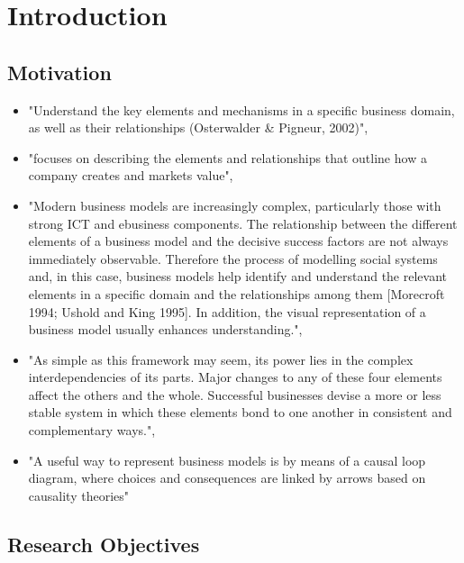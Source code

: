 \chapter{Introduction}\label{ch:intro}

\section{Motivation}

\begin{itemize}
	\item "Understand the key elements and mechanisms in a specific business domain, as well as their relationships (Osterwalder \& Pigneur, 2002)", \citep[p. 303]{Pateli2004}
	\item "focuses on describing the elements and relationships that outline how a company creates and markets value", \citep[p. 7]{Osterwalder2005}
	\item "Modern business models are increasingly complex, particularly those with strong ICT and ebusiness components. The relationship between the different elements of a business model and the decisive success factors are not always immediately observable. Therefore the process of modelling social systems and, in this case, business models help identify and understand the relevant elements in a specific domain and the relationships among them [Morecroft 1994; Ushold and King 1995]. In addition, the visual representation of a business model usually enhances understanding.", \citep[p. 14]{Osterwalder2005}
	\item "As simple as this framework may seem, its power lies in the complex interdependencies of its parts. Major changes to any of these four elements affect the others and the whole. Successful businesses devise a more or less stable system in which these elements bond to one another in consistent and complementary ways.", \citep[p. 53]{Johnson2008}
	\item "A useful way to represent business models is by means of a causal loop diagram, where choices and consequences are linked by arrows based on causality theories" \citep[p. 198]{Casadesus-Masanell2010}
\end{itemize}


\section{Research Objectives}

